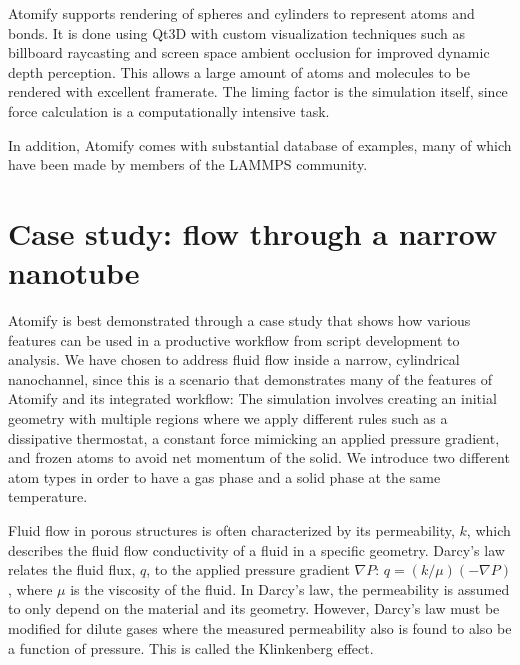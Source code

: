 \documentclass[12pt,a4paper,final]{iopart}
\begin{document}
Atomify supports rendering of spheres and cylinders to represent atoms and bonds.
It is done using Qt3D with custom visualization techniques such as
billboard raycasting\cite{gumhold2003splatting, sigg2006gpu, tarini2006ambient} and screen space ambient occlusion\cite{bavoil2008screen}
for improved dynamic depth perception. This allows a large amount of atoms and molecules to be rendered with excellent framerate.
The liming factor is the simulation itself, since force calculation is a computationally intensive task.

In addition, Atomify comes with substantial database of examples,
many of which have been made by members of the LAMMPS community.

\section{\label{sec:casestudy}Case study: flow through a narrow nanotube}
Atomify is best demonstrated through a case study that shows how 
various features can be used in a productive workflow from script development to analysis.
We have chosen to address fluid flow inside a narrow, cylindrical nanochannel, since this is a scenario that demonstrates many of the features of Atomify and its integrated workflow: The simulation involves creating an initial geometry with multiple regions 
where we apply different rules such as a dissipative thermostat, a constant force mimicking
an applied pressure gradient, and frozen atoms to avoid net momentum of the solid.
We introduce two different atom types in order to have a gas phase and a solid phase at the same temperature.

Fluid flow in porous structures is often characterized by its permeability, $k$, which describes the fluid flow conductivity of a fluid in a specific geometry. Darcy's law relates the fluid flux, $q$, to the applied pressure gradient $\nabla P$: $q = (k/\mu)(-\nabla P)$, where $\mu$ is the viscosity of the fluid. In Darcy's law, the permeability is assumed to only depend on the material and its geometry. 
However, Darcy's law must be modified for dilute
gases where the measured permeability also is found to also be a function of pressure.
This is called the Klinkenberg effect\cite{klinkenberg1941permeability}.
\end{document}
